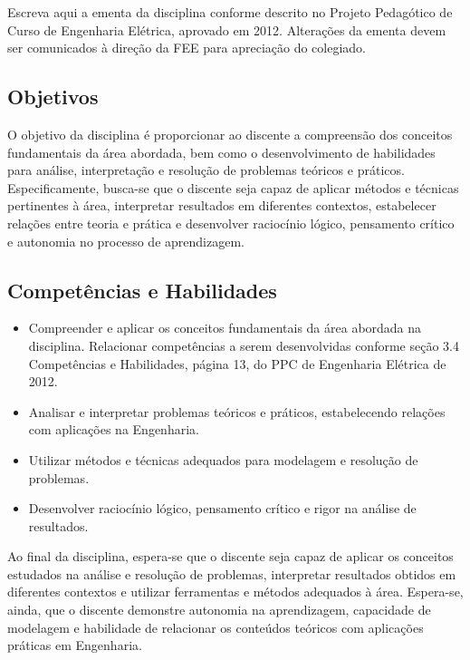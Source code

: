 \documentclass[oneside,a4paper,12pt]{article}
\begin{document}
  Escreva aqui a ementa da disciplina conforme descrito no Projeto Pedagótico de Curso de Engenharia Elétrica, aprovado em 2012. Alterações da ementa devem ser comunicados à direção da FEE para apreciação do colegiado.

  \begin{snugshade}
  \section{Objetivos}
\end{snugshade}

O objetivo da disciplina é proporcionar ao discente a compreensão dos conceitos fundamentais da área abordada, bem como o desenvolvimento de habilidades para análise, interpretação e resolução de problemas teóricos e práticos. Especificamente, busca-se que o discente seja capaz de aplicar métodos e técnicas pertinentes à área, interpretar resultados em diferentes contextos, estabelecer relações entre teoria e prática e desenvolver raciocínio lógico, pensamento crítico e autonomia no processo de aprendizagem.

\begin{snugshade}
  \section{Competências e Habilidades}
\end{snugshade}

\begin{itemize}

    \item Compreender e aplicar os conceitos fundamentais da área abordada na disciplina. Relacionar competências a serem desenvolvidas conforme seção 3.4 Competências e Habilidades, página 13, do PPC de Engenharia Elétrica de 2012.

    \item Analisar e interpretar problemas teóricos e práticos, estabelecendo relações com aplicações na Engenharia.

    \item Utilizar métodos e técnicas adequados para modelagem e resolução de problemas.

    \item Desenvolver raciocínio lógico, pensamento crítico e rigor na análise de resultados.

\end{itemize}

Ao final da disciplina, espera-se que o discente seja capaz de aplicar os conceitos estudados na análise e resolução de problemas, interpretar resultados obtidos em diferentes contextos e utilizar ferramentas e métodos adequados à área. Espera-se, ainda, que o discente demonstre autonomia na aprendizagem, capacidade de modelagem e habilidade de relacionar os conteúdos teóricos com aplicações práticas em Engenharia.
\end{document}
